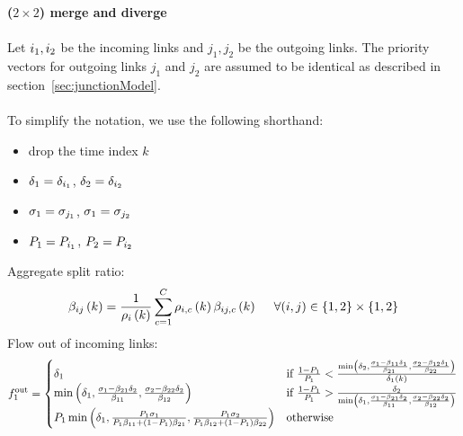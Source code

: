 \textbf{($2 \times 2$) merge and diverge}\\
\\  \indent Let $\icell_1, \icell_2$ be the incoming links and $j_1, j_2$ be the outgoing links. The priority vectors for outgoing links $j_1$ and $j_2$ are assumed to be identical as described in section~\ref{sec:junctionModel}. \\
\\To simplify the notation, we use the following shorthand:
\begin{itemize}
\item drop the time index $k$
\item $\celldemandnt{1}{\itime} = \celldemandnt{\icell_1}{\itime}$,
$\celldemandnt{2}{\itime} = \celldemandnt{\icell_2}{\itime}$
\item $\cellsupplynt{1}{\itime} = \cellsupplynt{j_1}{\itime}$, 
$\cellsupplynt{1}{\itime} = \cellsupplynt{j_2}{\itime}$
\item $\priority{1} = \priority{\icell_1}$, 
$\priority{2} = \priority{\icell_2}$
\end{itemize}
	\indent \indent \indent Aggregate split ratio:
	\[
	\aggsplitratio{i}{j}{k} = \frac{1}{\density{i}{k}} \sum_{c=1}^C \densitymc{i}{k}{c}\splitratio{i}{j}{k}{c} \ \ \ \ \forall{(i,j)\in{\{1, 2\}\times\{1,2\}}}
	\]
	\indent \indent  Flow out of incoming links:
	\[
	\flowoutnt{1}{\itime}=\begin{cases}
	\celldemandnt{1}{\itime} 
	& \text{if } \frac{1-\priority{1}}{\priority{1}} < \frac{ \min\left( \celldemandnt{2}{\itime}, {\frac{\cellsupplynt{1}{\itime} - \aggsplitrationt{1}{1}{k}\celldemandnt{1}{\itime}}{\aggsplitrationt{2}{1}{k}}},{\frac{\cellsupplynt{2}{\itime} - \aggsplitrationt{1}{2}{k}\celldemandnt{1}{\itime}}{\aggsplitrationt{2}{2}{k}}}\right)}
	{\celldemand{1}{\itime}}
	\\
\min\left( \celldemandnt{1}{\itime}, {\frac{\cellsupplynt{1}{\itime} - \aggsplitrationt{2}{1}{k}\celldemandnt{2}{\itime}}{\aggsplitrationt{1}{1}{k}}},{\frac{\cellsupplynt{2}{\itime} - \aggsplitrationt{2}{2}{k}\celldemandnt{2}{\itime}}{\aggsplitrationt{1}{2}{k}}}\right)	& \text{if } \frac{1-\priority{1}}{\priority{1}} > \frac{{\celldemandnt{2}{\itime}}}{\min\left( \celldemandnt{1}{\itime}, {\frac{\cellsupplynt{1}{\itime} - \aggsplitrationt{2}{1}{k}\celldemandnt{2}{\itime}}{\aggsplitrationt{1}{1}{k}}},{\frac{\cellsupplynt{2}{\itime} - \aggsplitrationt{2}{2}{k}\celldemandnt{2}{\itime}}{\aggsplitrationt{1}{2}{k}}}\right)}
	\\
	\priority{1}\min\left( \celldemandnt{1}{\itime}, {\frac{\priority{1}\cellsupplynt{1}{\itime}}{\priority{1}\aggsplitrationt{1}{1}{k} + \left(1-\priority{1}\right)\aggsplitrationt{2}{1}{k}}},{\frac{\priority{1}\cellsupplynt{2}{\itime}}{\priority{1}\aggsplitrationt{1}{2}{k} + \left(1-\priority{1}\right)\aggsplitrationt{2}{2}{k}}}\right) & \text{otherwise }
	\end{cases}
	\]
